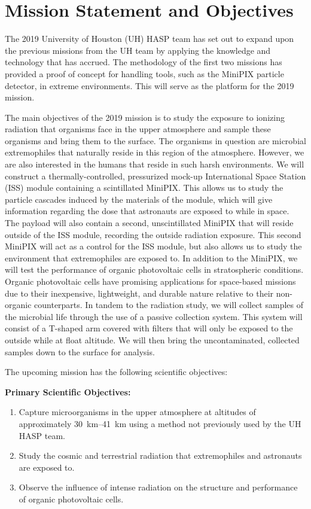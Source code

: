 \section{Mission Statement and Objectives}
\label{sec:Introduction}


The 2019 University of Houston (UH) HASP team has set out to expand upon the previous missions \cite{SORA1}\cite{SORA2} from the UH team by applying the knowledge and technology that has accrued.
The methodology of the first two missions has provided a proof of concept for handling tools, such as the MiniPIX particle detector,  in extreme environments.
This will serve as the platform for the 2019 mission.

The main objectives of the 2019 mission is to study the exposure to ionizing radiation that organisms face in the upper atmosphere and sample these organisms and bring them to the surface.
The organisms in question are microbial extremophiles that naturally reside in this region of the atmosphere.
However, we are also interested in the humans that reside in such harsh environments.
We will construct a thermally-controlled, pressurized mock-up International Space Station (ISS) module containing a scintillated MiniPIX.
This allows us to study the particle cascades induced by the materials of the module, which will give information regarding the dose that astronauts are exposed to while in space.
The payload will also contain a second, unscintillated MiniPIX that will reside outside of the ISS module, recording the outside radiation exposure.
This second MiniPIX will act as a control for the ISS module, but also allows us to study the environment that extremophiles are exposed to.
In addition to the MiniPIX, we will test the performance of organic photovoltaic cells in stratospheric conditions.
Organic photovoltaic cells have promising applications for space-based missions due to their inexpensive, lightweight, and durable nature relative to their non-organic counterparts.
In tandem to the radiation study, we will collect samples of the microbial life through the use of a passive collection system.
This system will consist of a T-shaped arm covered with filters that will only be exposed to the outside while at float altitude.
We will then bring the uncontaminated, collected samples down to the surface for analysis.

\noindent The upcoming mission has the following scientific objectives:

\noindent \textbf {Primary Scientific Objectives:}
\begin{enumerate}
\item Capture microorganisms in the upper atmosphere at altitudes of approximately \SIrange{30}{41}{\kilo\meter} using a method not previously used by the UH HASP team. 
\item Study the cosmic and terrestrial radiation that extremophiles and astronauts are exposed to.
\item Observe the influence of intense radiation on the structure and performance of organic photovoltaic cells.
\end{enumerate}

